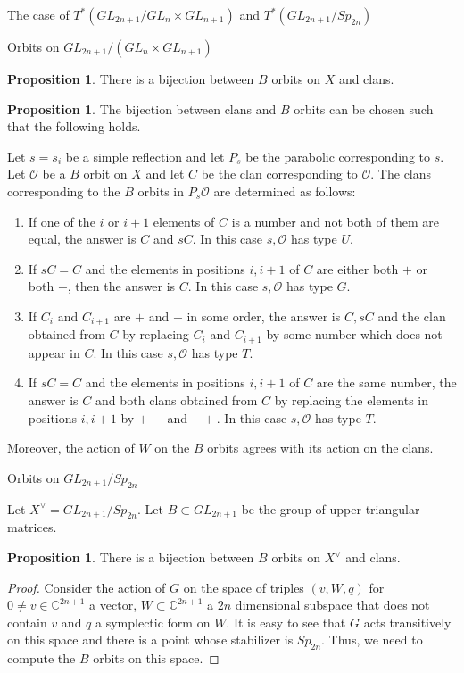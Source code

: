 \documentclass[12pt]{article}
\newcommand{\C}{\mathbb{C}}
\newcommand{\s}{\mathcal{O}}
\theoremstyle{plain}
\theoremstyle{definition}
\newtheorem{prop}[theorem]{Proposition}
\begin{document}
\begin{subsection}{The case of $T^*(GL_{2n+1}/GL_n\times GL_{n+1})$ and $T^*(GL_{2n+1}/Sp_{2n})$}
\begin{subsubsection}{Orbits on $GL_{2n+1}/(GL_n\times GL_{n+1})$}
\begin{prop}
    There is a bijection between $B$ orbits on $X$ and clans.
\end{prop}

\begin{prop}\label{B orbits in Ps for GL/GL}
    The bijection between clans and $B$ orbits can be chosen such that the following holds.
    
    Let $s=s_i$ be a simple reflection and let $P_s$ be the parabolic corresponding to $s$. Let $\s$ be a $B$ orbit on $X$ and let $C$ be the clan corresponding to $\s$. The clans corresponding to the $B$ orbits in $P_s\s$ are determined as follows:
    \begin{enumerate}
        \item If one of the $i$ or $i+1$ elements of $C$ is a number and not both of them are equal, the answer is $C$ and $sC$. In this case $s,\s$ has type $U$.
        \item If $sC=C$ and the elements in positions $i,i+1$ of $C$ are either both $+$ or both $-$, then the answer is $C$. In this case $s,\s$ has type $G$.
        \item If $C_i$ and $C_{i+1}$ are $+$ and $-$ in some order, the answer is $C,sC$ and the clan obtained from $C$ by replacing $C_i$ and $C_{i+1}$ by some number which does not appear in $C$. In this case $s,\s$ has type $T$.
        \item If $sC=C$ and the elements in positions $i,i+1$ of $C$ are the same number, the answer is $C$ and both clans obtained from $C$ by replacing the elements in positions $i,i+1$ by $+-$ and $-+$. In this case $s,\s$ has type $T$.
    \end{enumerate}

    Moreover, the action of $W$ on the $B$ orbits agrees with its action on the clans.
\end{prop}
    
\end{subsubsection}

\begin{subsubsection}{Orbits on $GL_{2n+1}/Sp_{2n}$}

Let $X^\vee=GL_{2n+1}/Sp_{2n}$. Let $B\subset GL_{2n+1}$ be the group of upper triangular matrices.

\begin{prop}\label{B orbits on GL/Sp}
    There is a bijection between $B$ orbits on $X^\vee$ and clans.
\end{prop}

\begin{proof}
Consider the action of $G$ on the space of triples $(v,W,q)$ for $0\neq v\in\C^{2n+1}$ a vector, $W\subset \C^{2n+1}$ a $2n$ dimensional subspace that does not contain $v$ and $q$ a symplectic form on $W$. It is easy to see that $G$ acts transitively on this space and there is a point whose stabilizer is $Sp_{2n}$.  Thus, we need to compute the $B$ orbits on this space. 


\end{proof}
\end{subsubsection}
\end{subsection}
\end{document}
